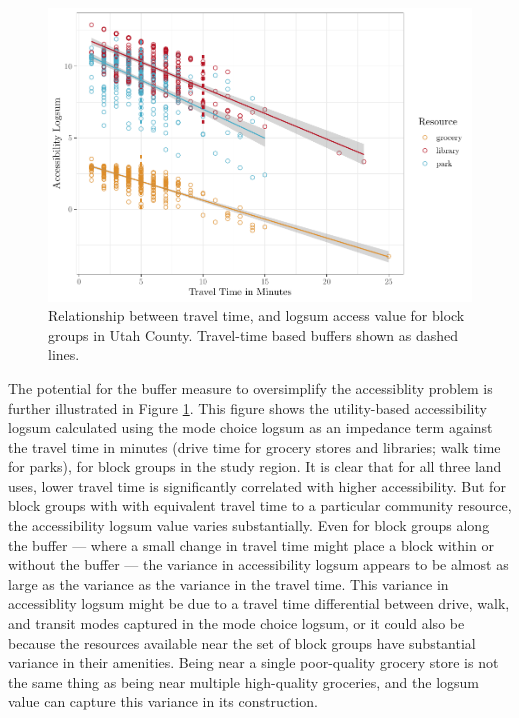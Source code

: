 \documentclass[3p, authoryear, review]{elsarticle} %
\begin{document}
\begin{figure}
\centering
\includegraphics{Community_Resources_files/figure-latex/access-plot-1.pdf}
\caption{\label{fig:access-plot}Relationship between travel time, and logsum access value for block groups in Utah County. Travel-time based buffers shown as dashed lines.}
\end{figure}

The potential for the buffer measure to oversimplify the accessiblity problem is further
illustrated in
Figure \ref{fig:access-plot}. This figure shows the utility-based accessibility
logsum calculated using the mode choice logsum as an impedance term against the
travel time in minutes (drive time for grocery stores and libraries; walk time
for parks), for block groups in the study region. It is clear that for all three
land uses,
lower travel time is significantly correlated with higher accessibility.
But for block groups with with equivalent travel time to a particular community
resource, the accessibility logsum value
varies substantially. Even for block groups along the buffer --- where a small change
in travel time might place a block within or without the buffer --- the variance
in accessibility logsum appears to be almost as large as the variance as the variance
in the travel time. This variance in accessiblity logsum might be due to a
travel time differential between drive, walk, and transit modes captured in the
mode choice logsum, or it could also be because the resources available near the
set of block groups have substantial variance in their amenities. Being near a
single poor-quality grocery store is not the same thing as being near multiple
high-quality groceries, and the logsum value can capture this variance in its
construction.
\end{document}
